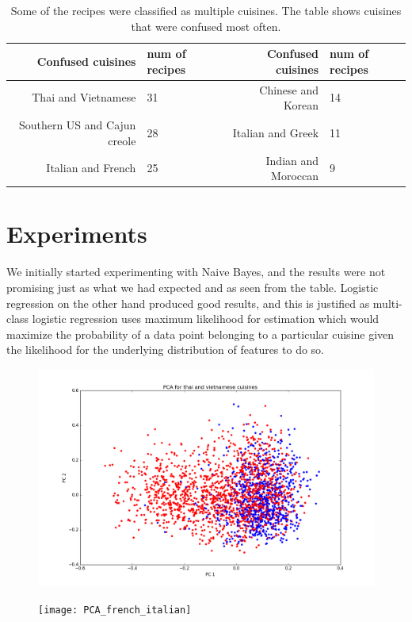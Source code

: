 \documentclass[prodmode,acmtap]{acmlarge}
\begin{document}
\begin {table}[hb]
\centering
\begin{tabular}{|r|l||r|l|}
  \hline
  Confused cuisines & num of recipes & Confused cuisines & num of recipes \\
  \hline
  Thai and Vietnamese & 31 & Chinese and Korean & 14\\
  Southern US and Cajun creole & 28 & Italian and Greek & 11\\
  Italian and French & 25 & Indian and Moroccan & 9 \\
  \hline
\end{tabular}
\caption{Some of the recipes were classified as multiple cuisines. The table shows cuisines that were confused most often.}
\label{confusiontable}
\end {table}


\section {Experiments}
We initially started experimenting with Naive Bayes, and the results were not promising just as what we had expected and as seen from the table. Logistic regression on the other hand produced good results, and this is justified as multi-class logistic regression uses maximum likelihood for estimation which would maximize the probability of a data point belonging to a particular cuisine given the likelihood for the underlying distribution of features to do so.

\begin{figure}[t]
\centering
\begin{minipage}{.45\textwidth}
  \centering
  \includegraphics[width=\textwidth]{PCA_thai_vietnam}
  \label{thai_taiwan_pca12}
\end{minipage}
\hfill
\begin{minipage}{.45\textwidth}
  \centering
  \texttt{[image: PCA\_french\_italian]}
  \label{french_italian_pca12}
\end{minipage}%
\end{figure}
\end{document}
